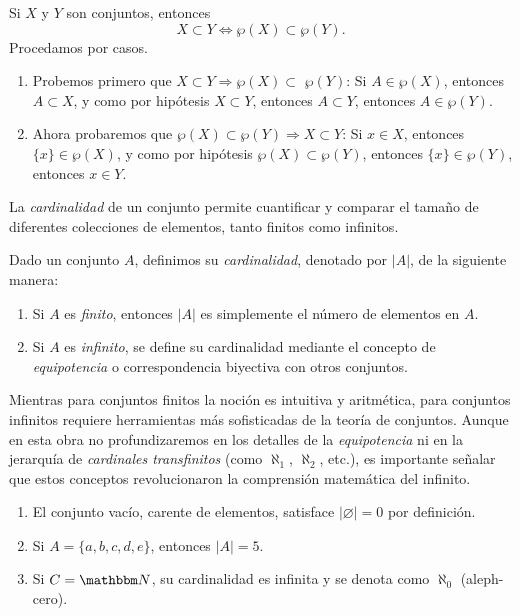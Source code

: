 \begin{theorem}{}{}
    Si $X$ y $Y$ son conjuntos, entonces
    $$X \subset Y \Longleftrightarrow \wp(X) \subset \wp(Y).$$
    \tcblower
    \demostracion Procedamos por casos.
    \begin{enumerate}[label=\roman*., topsep=6pt, itemsep=0pt]
        \item Probemos primero que $X \subset Y \Longrightarrow \wp(X) \subset$ $\wp(Y)$: Si $A \in \wp(X)$, entonces $A \subset X$, y como por hipótesis $X \subset Y$, entonces $A \subset Y$, entonces $A \in \wp(Y)$.
        \item Ahora probaremos que $\wp(X) \subset \wp(Y) \Longrightarrow X \subset Y$: Si $x \in X$, entonces $\{x\} \in \wp(X)$, y como por hipótesis $\wp(X) \subset \wp(Y)$, entonces $\{x\} \in \wp(Y)$, entonces $x \in Y$.
    \end{enumerate}
\end{theorem}

La \emph{cardinalidad} de un conjunto permite cuantificar y comparar el tamaño de diferentes colecciones de elementos, tanto finitos como infinitos.

\begin{definicion}{}{}
    Dado un conjunto $A$, definimos su \emph{cardinalidad}, denotado por $|A|$, de la siguiente manera:
    \begin{enumerate}[label=\roman*., topsep=6pt, itemsep=0pt]
        \item Si $A$ es \emph{finito}, entonces $|A|$ es simplemente el número de elementos en $A$.
        \item Si $A$ es \emph{infinito}, se define su cardinalidad mediante el concepto de \emph{equipotencia} o correspondencia biyectiva con otros conjuntos.
    \end{enumerate}
\end{definicion}

Mientras para conjuntos finitos la noción es intuitiva y aritmética, para conjuntos infinitos requiere herramientas más sofisticadas de la teoría de conjuntos. Aunque en esta obra no profundizaremos en los detalles de la \emph{equipotencia} ni en la jerarquía de \emph{cardinales transfinitos} (como $\aleph_1$, $\aleph_2$, etc.), es importante señalar que estos conceptos revolucionaron la comprensión matemática del infinito.

\begin{examplebox}{}{}
    \begin{enumerate}[topsep=6pt, itemsep=0pt]
        \item El conjunto vacío, carente de elementos, satisface $| \varnothing | = 0$ por definición.
        \item Si $A = \{a, b, c, d, e\}$, entonces $|A| = 5$.
        \item Si $C = \NN$, su cardinalidad es infinita y se denota como $\aleph_0$ (aleph-cero).
    \end{enumerate}
\end{examplebox}

